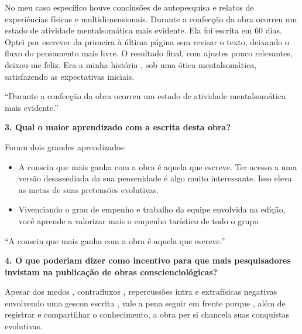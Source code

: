 \documentclass{gescons}
\begin{document}
\begin{multicols}{2}
No meu caso específico houve conclusões de autopesquisa e relatos de experiências físicas e multidimensionais. Durante a confecção da obra ocorreu um estado de atividade mentalsomática mais evidente. Ela foi escrita em 60 dias. Optei por escrever da primeira à última página sem  revisar o texto, deixando o fluxo do pensamento mais livre. O resultado final, com ajustes pouco relevantes, deixou-me feliz. Era a minha  história , sob uma ótica mentalsomática, satisfazendo as expectativas iniciais.

\begin{pullquote}
    ``Durante a confecção da obra ocorreu um estado de atividade mentalsomática mais evidente.''
\end{pullquote}


\textbf{3.       Qual o maior aprendizado com a escrita desta obra?}

Foram dois grandes aprendizados:

\begin{itemize}
\item
  A conscin que mais ganha com a obra é aquela que escreve. Ter acesso a uma versão desassediada da sua pensenidade é algo muito interessante. Isso eleva as metas de suas pretensões evolutivas.
\item
  Vivenciando o grau de empenho e trabalho da equipe envolvida na edição, você aprende a valorizar mais o empenho tarístico de todo o grupo
\end{itemize}

\begin{pullquote}
    ``A conscin que mais ganha com a obra é aquela que escreve.''
\end{pullquote}


\textbf{4.       O que poderiam dizer como incentivo para que mais pesquisadores invistam na publicação de obras conscienciológicas?}

Apesar dos medos , contrafluxos , repercussões intra e extrafísicas negativas envolvendo uma gescon escrita , vale a pena seguir em frente porque , além de registrar e compartilhar o conhecimento, a obra per si chancela suas conquistas evolutivas. 



    


    \end{multicols}
\end{document}
